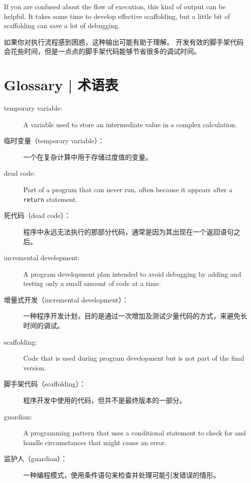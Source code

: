 %
If you are confused about the flow of execution, this kind of
output can be helpful.  It takes some time to develop effective
scaffolding, but a little bit of scaffolding can save a lot of debugging.

如果你对执行流程感到困惑，这种输出可能有助于理解。
开发有效的脚手架代码会花些时间，但是一点点的脚手架代码能够节省很多的调试时间。

\section{Glossary  |  术语表}

\begin{description}

\item[temporary variable:]  A variable used to store an intermediate value in
a complex calculation.
  

\item[临时变量（temporary variable）：] 一个在复杂计算中用于存储过度值的变量。

\item[dead code:]  Part of a program that can never run, often because
it appears after a {\tt return} statement.

\item[死代码（dead code）：] 程序中永远无法执行的那部分代码，通常是因为其出现在一个返回语句之后。

\item[incremental development:]  A program development plan intended to
avoid debugging by adding and testing only
a small amount of code at a time.

\item[增量式开发（incremental development）：] 一种程序开发计划，目的是通过一次增加及测试少量代码的方式，来避免长时间的调试。

\item[scaffolding:]  Code that is used during program development but is
not part of the final version.

\item[脚手架代码（scaffolding）：] 程序开发中使用的代码，但并不是最终版本的一部分。

\item[guardian:]  A programming pattern that uses a conditional
statement to check for and handle circumstances that
might cause an error.
  

\item[监护人（guardian）：] 一种编程模式，使用条件语句来检查并处理可能引发错误的情形。

\end{description}


